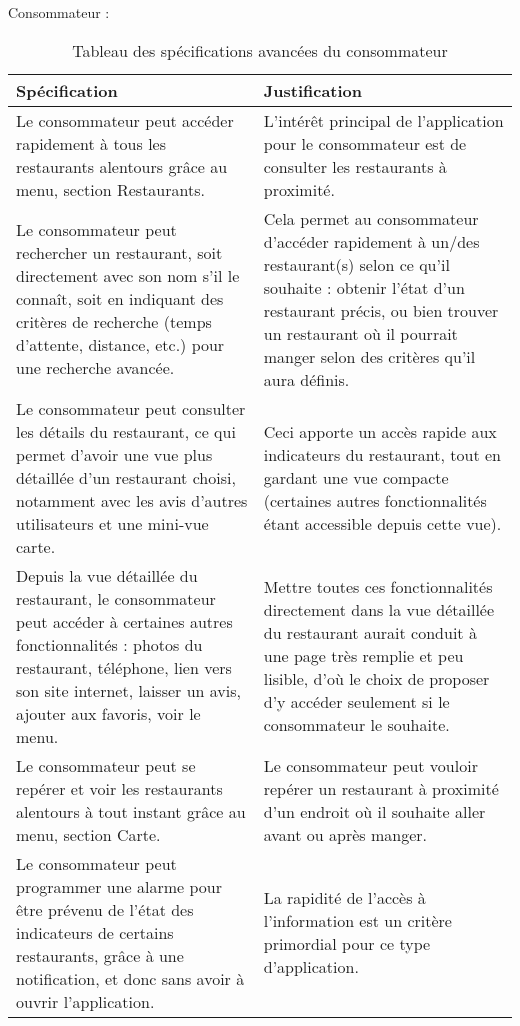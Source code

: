 Consommateur : \\
\begin{table}[H]
    \centering
    \caption{Tableau des spécifications avancées du consommateur}
    \label{min-spec-table}
    \begin{tabular}{p{8cm}|p{8cm}}
 	\bf{Spécification} & \bf{Justification} \\ \hline
            Le consommateur peut accéder rapidement à tous les restaurants alentours grâce au menu, section \og{}Restaurants\fg{}. & L'intérêt principal de l'application pour le consommateur est de consulter les restaurants à proximité. \\ \hline
            Le consommateur peut rechercher un restaurant, soit directement avec son nom s'il le connaît, soit en indiquant des critères de recherche (temps d'attente, distance, etc.) pour une recherche avancée. & Cela permet au consommateur d'accéder rapidement à un/des restaurant(s) selon ce qu'il souhaite : obtenir l'état d'un restaurant précis, ou bien trouver un restaurant où il pourrait manger selon des critères qu'il aura définis. \\ \hline
            Le consommateur peut consulter les détails du restaurant, ce qui permet d'avoir une vue plus détaillée d'un restaurant choisi, notamment avec les avis d'autres utilisateurs et une mini-vue carte. & Ceci apporte un accès rapide aux indicateurs du restaurant, tout en gardant une vue compacte (certaines autres fonctionnalités étant accessible depuis cette vue). \\ \hline
            Depuis la vue détaillée du restaurant, le consommateur peut accéder à certaines autres fonctionnalités : photos du restaurant, téléphone, lien vers son site internet, laisser un avis, ajouter aux favoris, voir le menu. & Mettre toutes ces fonctionnalités directement dans la vue détaillée du restaurant aurait conduit à une page très remplie et peu lisible, d'où le choix de proposer d'y accéder seulement si le consommateur le souhaite. \\ \hline
            Le consommateur peut se repérer et voir les restaurants alentours à tout instant grâce au menu, section \og{}Carte\fg{}. & Le consommateur peut vouloir repérer un restaurant à proximité d'un endroit où il souhaite aller avant ou après manger. \\ \hline
            Le consommateur peut programmer une alarme pour être prévenu de l'état des indicateurs de certains restaurants, grâce à une notification, et donc sans avoir à ouvrir l'application. & La rapidité de l'accès à l'information est un critère primordial pour ce type d'application. \\
    \end{tabular}
\end{table}

